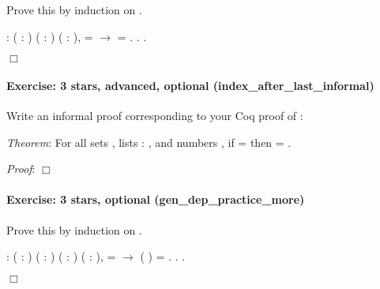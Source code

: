 \documentclass[12pt]{report}
\begin{document}
 Prove this by induction on . \begin{coqdoccode}
\coqdocemptyline
\coqdocnoindent
{} : \coqdockw{\ensuremath{\forall}} ( : ) ( : ) ( :  ),\coqdoceol
\coqdocindent{2.50em}
  =  \ensuremath{\rightarrow}\coqdoceol
\coqdocindent{2.50em}
   = .\coqdoceol
\coqdocnoindent
{}.\coqdoceol
 .\coqdoceol
\end{coqdoccode}
\ensuremath{\Box} 

\paragraph{Exercise: 3 stars, advanced, optional (index\_after\_last\_informal)}

 Write an informal proof corresponding to your Coq proof
    of :


     \textit{Theorem}: For all sets , lists  :  , and numbers
      , if   =  then    = .


     \textit{Proof}:
     \ensuremath{\Box}


\paragraph{Exercise: 3 stars, optional (gen\_dep\_practice\_more)}

 Prove this by induction on . \begin{coqdoccode}
\coqdocemptyline
\coqdocnoindent
{}  : \coqdockw{\ensuremath{\forall}} ( : ) ( : ) \coqdoceol
\coqdocindent{15.00em}
( : ) ( :  ),\coqdoceol
\coqdocindent{2.50em}
  =  \ensuremath{\rightarrow}\coqdoceol
\coqdocindent{2.50em}
 (  ) =  .\coqdoceol
\coqdocnoindent
{}.\coqdoceol
 .\coqdoceol
\end{coqdoccode}
\ensuremath{\Box} 
\end{document}
